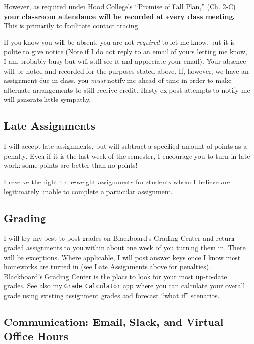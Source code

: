 \documentclass{article}
\begin{document}
However, as required under Hood College's ``Promise of Fall Plan,'' (Ch.
2-C) \textbf{your classroom attendance will be recorded at every class
meeting.} This is primarily to facilitate contact tracing.

If you know you will be absent, you are not \emph{required} to let me
know, but it is polite to give notice (Note if I do not reply to an
email of yours letting me know, I am probably busy but will still see it
and appreciate your email). Your absence will be noted and recorded for
the purposes stated above. If, however, we have an assignment due in
class, you \emph{must} notify me ahead of time in order to make
alternate arrangements to still receive credit. Hasty ex-post attempts
to notify me will generate little sympathy.

\hypertarget{late-assignments}{%
\subsection{Late Assignments}\label{late-assignments}}

I will accept late assignments, but will subtract a specified amount of
points as a penalty. Even if it is the last week of the semester, I
encourage you to turn in late work: some points are better than no
points!

I reserve the right to re-weight assignments for students whom I believe
are legitimately unable to complete a particular assignment.

\hypertarget{grading}{%
\subsection{Grading}\label{grading}}

I will try my best to post grades on Blackboard's Grading Center and
return graded assignments to you within about one week of you turning
them in. There will be exceptions. Where applicable, I will post answer
keys once I know most homeworks are turned in (see Late Assignments
above for penalties). Blackboard's Grading Center is the place to look
for your most up-to-date grades. See also my
\href{https://ryansafner.shinyapps.io/dev_grade_calculator/}{
\texttt{Grade\ Calculator}} app where you can calculate your overall
grade using existing assignment grades and forecast ``what if''
scenarios.

\hypertarget{communication-email-slack-and-virtual-office-hours}{%
\subsection{Communication: Email, Slack, and Virtual Office
Hours}\label{communication-email-slack-and-virtual-office-hours}}
\end{document}
